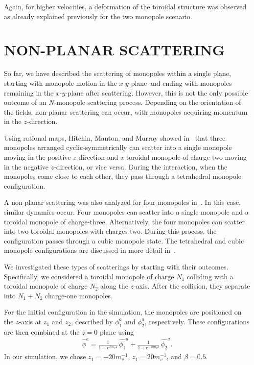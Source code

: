 \documentclass[aps, prd, twocolumn, superscriptaddress, preprintnumbers, nofootinbib, longbibliography]{revtex4-1}
\begin{document}
Again, for higher velocities, a deformation of the toroidal structure was observed as already explained previously for the two monopole scenario.



\section{\MakeUppercase{Non-planar scattering}}
\label{sec:non-planar-scattering}
So far, we have described the scattering of monopoles within a single plane, starting with monopole motion in the $x$-$y$-plane and ending with monopoles remaining in the $x$-$y$-plane after scattering. However, this is not the only possible outcome of an $N$-monopole scattering process. Depending on the orientation of the fields, non-planar scattering can occur, with monopoles acquiring momentum in the $z$-direction.

Using rational maps, Hitchin, Manton, and Murray showed in~\cite{Hitchin:1995qw} that three monopoles arranged 
cyclic-symmetrically can scatter into a single monopole moving in the positive $z$-direction and a toroidal monopole of charge-two moving in the negative $z$-direction, or vice versa. During the interaction, when the monopoles come close to each other, they pass through a tetrahedral monopole configuration.

A non-planar scattering was also analyzed for four monopoles in~\cite{Hitchin:1995qw}. In this case, similar dynamics occur. Four monopoles can scatter into a single monopole and a toroidal monopole of charge-three. Alternatively, the four monopoles can scatter into two toroidal monopoles with charges two. During this process, the configuration passes through a cubic monopole state. The tetrahedral and cubic monopole configurations are discussed in more detail in~\cite{Houghton:1995bs}.

We investigated these types of scatterings by starting with their outcomes. Specifically, we considered a toroidal monopole of charge $N_1$ colliding with a toroidal monopole of charge $N_2$ along the $z$-axis. After the collision, they separate into $N_1 + N_2$ charge-one monopoles.

For the initial configuration in the simulation, the monopoles are positioned on the $z$-axis at $z_1$ and $z_2$, described by $\phi_1^a$ and $\phi_2^a$, respectively. These configurations are then combined at the $z=0$ plane using
\begin{align}
    \hat{\phi}^a=\frac{1}{1+e^{\beta m_v z}}\, \hat{\phi_1}^a+\frac{1}{1+e^{-\beta m_v z}}\, \hat{\phi_2}^a.
\end{align}
In our simulation, we chose $z_1=-20 m_v^{-1}$, $z_1=20 m_v^{-1}$, and $\beta=0.5$.
\end{document}

